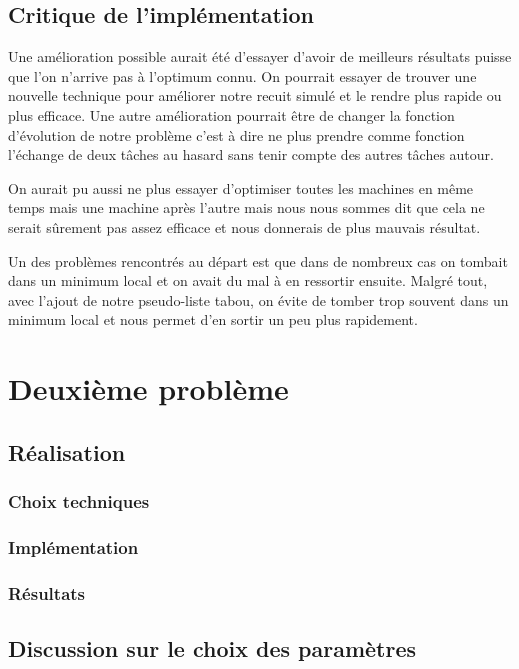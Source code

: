 \documentclass{report}
\begin{document}
\section{Critique de l'implémentation}
Une amélioration possible aurait été d'essayer d'avoir de meilleurs résultats puisse que l'on n'arrive pas à l'optimum connu. On pourrait essayer de trouver une nouvelle technique pour améliorer notre recuit simulé et le rendre plus rapide ou plus efficace. Une autre amélioration pourrait être de changer la fonction d'évolution de notre problème c'est à dire ne plus prendre comme fonction l'échange de deux tâches au hasard sans tenir compte des autres tâches autour.

On aurait pu aussi ne plus essayer d'optimiser toutes les machines en même temps mais une machine après l'autre mais nous nous sommes dit que cela ne serait sûrement pas assez efficace et nous donnerais de plus mauvais résultat.

Un des problèmes rencontrés au départ est que dans de nombreux cas on tombait dans un minimum local et on avait du mal à en ressortir ensuite.  Malgré tout, avec l'ajout de notre pseudo-liste tabou, on évite de tomber trop souvent dans un minimum local et nous permet d'en sortir un peu plus rapidement.

\newpage

\chapter{Deuxième problème}
\minitoc
\section{Réalisation}
\subsection{Choix techniques}

\subsection{Implémentation}

\subsection{Résultats}

\section{Discussion sur le choix des paramètres}
\end{document}
